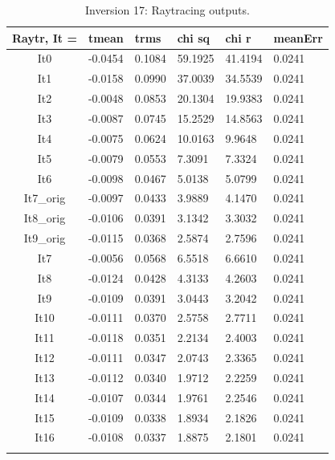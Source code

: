 \documentclass[fontsize=11pt, %
                             paper=a4, %
                             twoside, %
                             captions=tableheading,
                             index=totoc,
                             hyperref]{labbook}
\begin{document}
\begin{addmargin}[4cm]{0cm}

\begin{table}[!ht]
\label{tab:r17}
\raggedleft
\begin{tabular}{c l l l l l}
\toprule
\textbf{Raytr, It = } & \textbf{tmean} & \textbf{trms} & \textbf{chi sq} & \textbf{chi r} & \textbf{meanErr} \\
\toprule
It0 & -0.0454 & 0.1084 & 59.1925 & 41.4194 & 0.0241\\
It1 & -0.0158 & 0.0990 & 37.0039 & 34.5539 & 0.0241\\
It2 & -0.0048 & 0.0853 & 20.1304 & 19.9383 & 0.0241\\
It3 & -0.0087 & 0.0745 & 15.2529 & 14.8563 & 0.0241\\
It4 & -0.0075 & 0.0624 & 10.0163 & 9.9648 & 0.0241\\
It5 & -0.0079 & 0.0553 & 7.3091 & 7.3324 & 0.0241\\
It6 & -0.0098 & 0.0467 & 5.0138 & 5.0799 & 0.0241\\
It7\_orig & -0.0097 & 0.0433 & 3.9889 & 4.1470 & 0.0241\\
It8\_orig & -0.0106 & 0.0391 & 3.1342 & 3.3032 & 0.0241\\
It9\_orig & -0.0115 & 0.0368 & 2.5874 & 2.7596 & 0.0241\\
It7 & -0.0056 & 0.0568 & 6.5518 & 6.6610 & 0.0241\\
It8 & -0.0124 & 0.0428 & 4.3133 & 4.2603 & 0.0241\\
It9 & -0.0109 & 0.0391 & 3.0443 & 3.2042 & 0.0241\\
It10 & -0.0111 & 0.0370 & 2.5758 & 2.7711 & 0.0241\\
It11 & -0.0118 & 0.0351 & 2.2134 & 2.4003 & 0.0241\\
It12 & -0.0111 & 0.0347 & 2.0743 & 2.3365 & 0.0241\\
It13 & -0.0112 & 0.0340 & 1.9712 & 2.2259 & 0.0241\\
It14 & -0.0107 & 0.0344 & 1.9761 & 2.2546 & 0.0241\\
It15 & -0.0109 & 0.0338 & 1.8934 & 2.1826 & 0.0241\\
It16 & -0.0108 & 0.0337 & 1.8875 & 2.1801 & 0.0241\\
\bottomrule\\
\end{tabular}
\caption{Inversion 17: Raytracing outputs.}
\end{table}


\end{addmargin}
\end{document}
